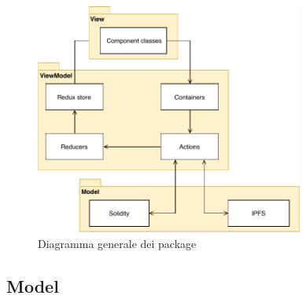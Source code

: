 \begin{figure}[h]
	\centering
	\includegraphics[height=3in]{./Diagrammi/FrameworkPackageGenerale.pdf}
	\caption{Diagramma generale dei package}
	\label{}
\end{figure}

	\subsection{Model}
